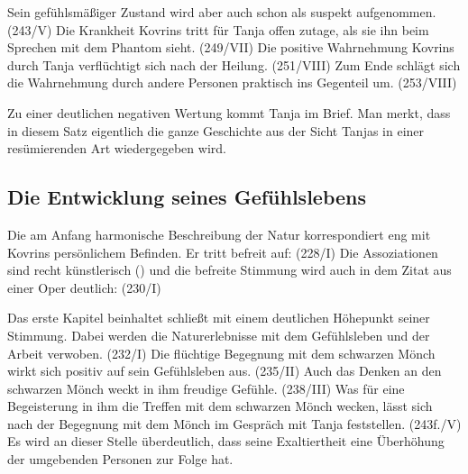 \documentclass{../../sem_paper}
\begin{document}
Sein gefühlsmäßiger Zustand wird aber auch schon als suspekt aufgenommen. 
(243/V) Die Krankheit Kovrins tritt für Tanja offen zutage,
als sie ihn beim Sprechen mit dem Phantom sieht. (249/VII) Die positive Wahrnehmung Kovrins
durch Tanja verflüchtigt sich nach der Heilung. (251/VIII) Zum Ende schlägt sich die Wahrnehmung durch andere
Personen praktisch ins Gegenteil um. (253/VIII)

Zu einer deutlichen negativen Wertung kommt Tanja im Brief.  Man
merkt, dass in diesem Satz eigentlich die ganze Geschichte aus der Sicht Tanjas in einer
resümierenden Art wiedergegeben wird.

\subsection{Die Entwicklung seines Gefühlslebens}
Die am Anfang harmonische Beschreibung der Natur korrespondiert eng mit Kovrins persönlichem
Befinden. Er tritt befreit auf: (228/I) Die Assoziationen sind
recht künstlerisch () und die
befreite Stimmung wird auch in dem Zitat aus einer Oper deutlich:
(230/I)

Das erste Kapitel beinhaltet schließt mit einem deutlichen Höhepunkt seiner Stimmung. Dabei
werden die Naturerlebnisse mit dem Gefühlsleben und der Arbeit verwoben. (232/I)
Die flüchtige Begegnung mit dem schwarzen Mönch wirkt sich positiv auf sein Gefühlsleben aus.
(235/II) Auch das Denken an den schwarzen
Mönch weckt in ihm freudige Gefühle. (238/III) Was für eine
Begeisterung in ihm die Treffen mit dem schwarzen Mönch wecken, lässt sich nach der Begegnung
mit dem Mönch im Gespräch mit Tanja feststellen. (243f./V) Es wird an dieser Stelle überdeutlich, dass seine Exaltiertheit eine Überhöhung der
umgebenden Personen zur Folge hat.
\end{document}
